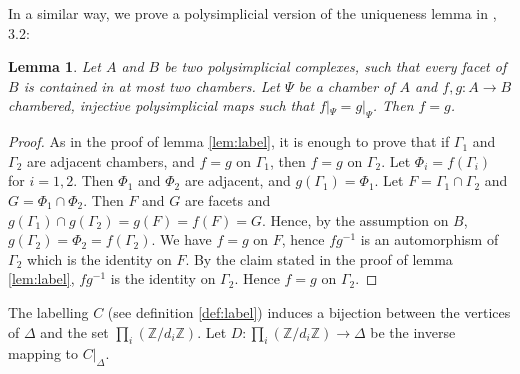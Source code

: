 \documentclass{amsart}
\theoremstyle{theorem}
\theoremstyle{lemma}
\newtheorem{lemma}{Lemma}[section]
\theoremstyle{prop}
\theoremstyle{definition}
\theoremstyle{corollary}
\theoremstyle{remark}
\newcommand{\Z}{\mathbb{Z}}
\begin{document}
In a similar way, we prove a polysimplicial version of the uniqueness lemma in \cite{gar}, 3.2:

\begin{lemma} \label{aptaut}
Let $A$ and $B$ be two polysimplicial complexes, such that every facet of $B$ is contained in at most two chambers. Let $\Psi$ be a chamber of $A$ and $f,g:A\rightarrow B$ chambered, injective polysimplicial maps such that $f|_\Psi = g|_\Psi$. Then $f=g$.
\end{lemma}

\begin{proof}
As in the proof of lemma \ref{lem:label}, it is enough to prove that if $\Gamma_1$ and $\Gamma_2$ are adjacent chambers, and $f=g$ on $\Gamma_1$, then $f=g$ on $\Gamma_2$. Let $\Phi_i=f(\Gamma_i)$ for $i=1,2$. Then $\Phi_1$ and $\Phi_2$ are adjacent, and $g(\Gamma_1)=\Phi_1$. Let $F=\Gamma_1 \cap \Gamma_2$ and  $G=\Phi_1 \cap \Phi_2$. Then $F$ and $G$ are facets and $g(\Gamma_1)\cap g(\Gamma_2)=g(F)=f(F)=G$. Hence, by the assumption on $B$, $g(\Gamma_2)=\Phi_2=f(\Gamma_2)$. We have $f=g$ on $F$, hence $fg^{-1}$ is an automorphism of $\Gamma_2$ which is the identity on $F$. By the claim stated in the proof of lemma \ref{lem:label}, $fg^{-1}$ is the identity on $\Gamma_2$. Hence $f=g$ on $\Gamma_2$.
\end{proof}

The labelling $C$ (see definition \ref{def:label}) induces a bijection between the vertices of $\Delta$ and the set $\prod_i(\Z/d_i\Z)$. Let $D: \prod_i(\Z/d_i\Z) \rightarrow \Delta$ be the inverse mapping to $C|_{\Delta}$.  
\end{document}
